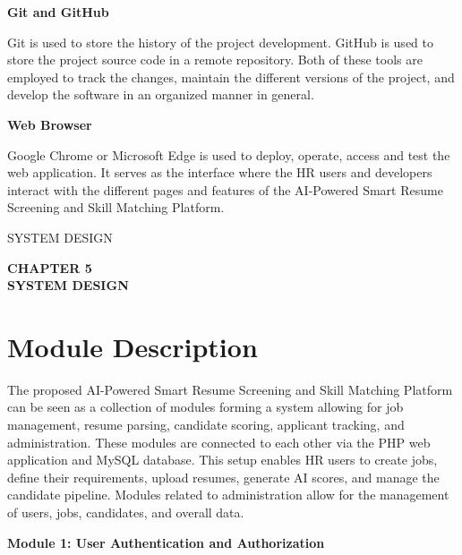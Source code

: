 \documentclass[12pt,a4paper]{report}
\begin{document}
\textbf{Git and GitHub}

Git is used to store the history of the project development. GitHub is used to store the project source code in a remote repository. Both of these tools are employed to track the changes, maintain the different versions of the project, and develop the software in an organized manner in general.

\textbf{Web Browser}

Google Chrome or Microsoft Edge is used to deploy, operate, access and test the web application. It serves as the interface where the HR users and developers interact with the different pages and features of the AI-Powered Smart Resume Screening and Skill Matching Platform.

\clearpage


{\protect\numberline{\thechapter}SYSTEM DESIGN}

\thispagestyle{empty}

\vspace*{\fill}

\begin{center}
    {\fontsize{14pt}{17pt}\selectfont\textbf{CHAPTER 5}}\\[1cm]
    {\fontsize{14pt}{17pt}\selectfont\textbf{SYSTEM DESIGN}}
\end{center}

\vspace*{\fill}

\clearpage

\section{Module Description}
The proposed AI-Powered Smart Resume Screening and Skill Matching Platform can be seen as a collection of modules forming a system allowing for job management, resume parsing, candidate scoring, applicant tracking, and administration. These modules are connected to each other via the PHP web application and MySQL database. This setup enables HR users to create jobs, define their requirements, upload resumes, generate AI scores, and manage the candidate pipeline. Modules related to administration allow for the management of users, jobs, candidates, and overall data.

\textbf{Module 1: User Authentication and Authorization}
\end{document}
